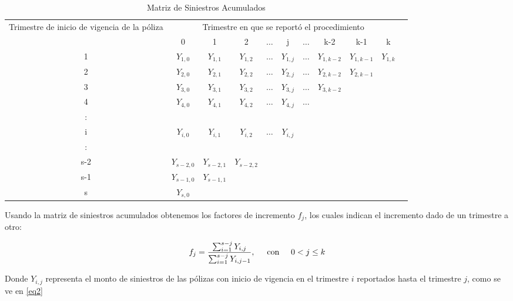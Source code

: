 \documentclass[11pt,twoside,openright,spanish]{report}
\numberwithin{equation}{chapter}
\numberwithin{figure}{chapter}
\numberwithin{table}{chapter}
\begin{document}
	\begin{table}[ht]
	\centering
		\caption{Matriz de Siniestros Acumulados}
	\begin{tabularx}{\linewidth}{c|cccccccccc}
		\multirow{2}{4cm}{Trimestre de inicio de vigencia de la póliza}&\multicolumn{9}{c}{ Trimestre en que se reportó el procedimiento} \\
		& 0  & 1 & 2 & $ \dots $ & j & $\dots $ & k-2 & k-1 &  k \\
		\midrule
		1      &  $Y_{1,0}^{}$ & $Y_{1,1}^{}$ & $Y_{1,2}^{}$ & $ \dots $ & $Y_{1,j}^{}$ & $ \dots $ & $Y_{1,k-2}^{}$ & $Y_{1,k-1}^{}$ & $Y_{1,k}^{}$ \\
		2      &  $Y_{2,0}^{}$ & $Y_{2,1}^{}$ & $Y_{2,2}^{}$ & $ \dots $ & $Y_{2,j}^{}$ & $ \dots $ & $Y_{2,k-2}^{}$ & $Y_{2,k-1}^{}$ & \\
		3      &  $Y_{3,0}^{}$ & $Y_{3,1}^{}$ & $Y_{3,2}^{}$ & $ \dots $ & $Y_{3,j}^{}$ & $ \dots $ & $Y_{3,k-2}^{}$ & & \\
		4      &  $Y_{4,0}^{}$ & $Y_{4,1}^{}$ & $Y_{4,2}^{}$ & $ \dots $ & $Y_{4,j}^{}$ & $ \dots $ & & & \\
		:      & & & & & & & & &\\
		i      &  $Y_{i,0}^{}$ & $Y_{i,1}^{}$ & $Y_{i,2}^{}$ & $ \dots $ & $Y_{i,j}^{}$ & & & & \\
		:      & & & & & & & & & \\
		s-2      &  $Y_{s-2,0}^{}$ & $Y_{s-2,1}^{}$ & $Y_{s-2,2}^{}$ & & & & & & \\
		s-1      &  $Y_{s-1,0}^{}$ & $Y_{s-1,1}^{}$ & & & & & & & \\
		s      &  $Y_{s,0}^{}$ & & & & & & & & \\
	\end{tabularx}
	\end{table}
	
	Usando la matriz de siniestros acumulados obtenemos los factores de incremento ${f}_{j}$, los cuales indican el incremento dado de un trimestre a otro:

	\begin{equation}
	{f}_{j}=\frac{\sum _{i=1}^{s-j}{Y}_{i,j}}{\sum _{i=1}^{s-j}{Y}_{i,j-1}}, \hspace{0.5cm}\text{con}\hspace{0.5cm} 0< j\le k
	\label{eq2}
	\end{equation}

	Donde ${Y}_{i,j}$ representa el monto de siniestros de las pólizas con inicio de vigencia en el trimestre $i$ reportados hasta el trimestre $j$, como se ve en \eqref{eq2}
\end{document}
